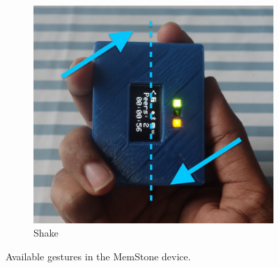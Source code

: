 \documentclass[mscthesis]{usiinfthesis}
\begin{document}
\begin{figure} [!ht]
\begin{subfigure}{0.16\textwidth}
\includegraphics[width=\linewidth]{Shake}
\caption{Shake} \label{fig:1e}
\end{subfigure}
\caption{Available gestures in the MemStone device.} \label{fig:1}
\end{figure}
\end{document}
